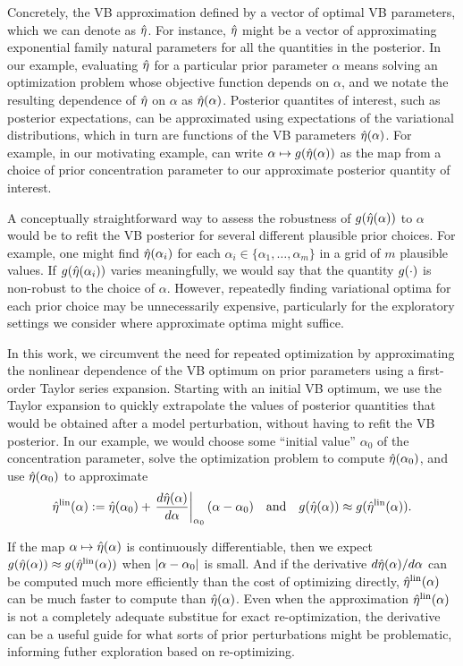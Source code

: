 Concretely, the VB approximation defined by a vector of optimal
VB parameters, which we can denote as $\hat\eta$.  For instance,
$\hat\eta$ might be a vector of approximating exponential family natural
parameters for all the quantities in the posterior.  In our example, evaluating
$\hat\eta$ for a particular prior parameter $\alpha$ means solving an
optimization problem whose objective function depends on $\alpha$, and we notate
the resulting dependence of $\hat\eta$ on $\alpha$ as $\hat\eta(\alpha)$.
%
Posterior quantites of interest, such as posterior expectations, can be
approximated using expectations of the variational distributions, which in turn
are functions of the VB parameters $\hat\eta(\alpha)$. For example, in our
motivating example, can write $\alpha \mapsto g(\hat\eta(\alpha))$ as the map
from a choice of prior concentration parameter to our approximate posterior
quantity of interest.

A conceptually straightforward way to assess the robustness of
$g(\hat\eta(\alpha))$ to $\alpha$ would be to refit the VB posterior for several
different plausible prior choices.  For example, one might find
$\hat\eta(\alpha_i)$ for each $\alpha_i \in \{\alpha_1, \ldots, \alpha_m \}$ in a
grid of $m$ plausible values.  If $g(\hat\eta(\alpha_i))$ varies meaningfully,
we would say that the quantity $g(\cdot)$ is non-robust to the choice of
$\alpha$.  However, repeatedly finding variational optima for each prior choice
may be unnecessarily expensive, particularly for the exploratory settings we
consider where approximate optima might suffice.

In this work, we circumvent the need for repeated optimization by approximating
the nonlinear dependence of the VB optimum on prior parameters using a
first-order Taylor series expansion.  Starting with an initial VB optimum, we
use the Taylor expansion to quickly extrapolate the values of posterior
quantities that would be obtained after a model perturbation, without having to
refit the VB posterior.  In our example, we would choose some ``initial value''
$\alpha_0$ of the concentration parameter, solve the optimization problem to
compute $\hat\eta(\alpha_0)$, and use $\hat\eta(\alpha_0)$ to approximate
%
\begin{align*}
%
\etalin(\alpha) :=
    \etaopt(\alpha_0) +
    \fracat{d\etaopt(\alpha)}{d\alpha}{\alpha_0} (\alpha - \alpha_0)
\mathand
g(\etaopt(\alpha)) \approx g(\etalin(\alpha)).
%
\end{align*}

If the map $\alpha \mapsto \hat\eta(\alpha)$ is continuously differentiable, then
we expect $g(\hat\eta(\alpha)) \approx g(\hat\eta^{\mathrm{lin}}(\alpha))$ when $\left|\alpha -
\alpha_0\right|$ is small.  And if the derivative $d\hat\eta(\alpha) / d\alpha$ can be
computed much more efficiently than the cost of optimizing directly,
$\hat\eta^{\mathrm{lin}}(\alpha)$ can be much faster to compute than $\hat\eta(\alpha)$.  Even
when the approximation $\hat\eta^{\mathrm{lin}}(\alpha)$ is not a completely adequate substitue
for exact re-optimization, the derivative can be a useful guide for what sorts
of prior perturbations might be problematic, informing futher exploration based
on re-optimizing.

